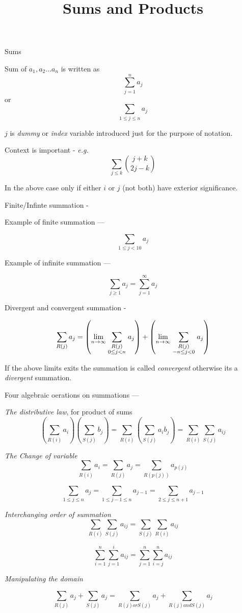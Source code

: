 \documentclass[12pt]{article}
\title{Sums and Products}
\begin{document}
\maketitle
  \begin{center}
    Sums
  \end{center}  
   Sum of $a_1,a_2 \ldots a_n$ is written as $$\sum_{j=1}^n {a_j} $$ or $$ \sum_{1 \le j \le n}a_j $$

   $j$ is {\sl dummy} or {\sl index} variable introduced just for the purpose of notation.

   Context is important - {\sl e.g.} $$ \sum _ {j \le k}{j+k \choose  2j -k}$$

   In the above case only if either $i$ or $j$ (not both) have exterior significance.

   Finite/Infinte summation -

   Example of finite summation ---

   $$ \sum_{1 \le j <10}{a_j} $$

   Example of infinite summation ---

   $$ \sum_{j \ge 1}{a_j} =  \sum_{j=1}^{\infty}{a_j} $$
   
   Divergent and convergent summation -

   $$  \sum_{R(j)}a_j = \left( \lim_{n\to\infty}\sum_{\scriptstyle R(j) \atop \scriptstyle 0  \le j < n} a_j \right) +
   \left( \lim_{n\to\infty}\sum_{\scriptstyle R(j) \atop  \scriptstyle -n \le j < 0}  a_j \right)  $$ 

   If the above limits exits the summation is called {\sl convergent} otherwise its a {\sl divergent} summation.

   Four algebraic oerations on summations ---

   \begin{enumerate}
     \begin{item}
       {\sl The distributive law}, for product of sums
       $$ \left(\sum_{R(i)}a_i\right) \left(\sum_{S(j)}b_j\right) = \sum_{R(i)}\left(\sum_{S(j)}a_ib_j\right) = \sum_{R(i)}\sum_{S(j)}a_{ij} $$
     \end{item}
     \begin{item}
       {\sl The Change of variable}
       $$\sum_{R(i)}a_i = \sum_{R(j)}a_j = \sum_{R(p(j))}a_{p(j)} $$

       $$\sum_{1 \le j \le n}a_j = \sum_{1 \le j-1 \le n }a_{j-1} = \sum_{2 \le j \le n+1}a_{j-1} $$
       
     \end{item}
     \begin{item}
       {\sl Interchanging order of summation}
       $$\sum_{R(i)}\sum_{S(j)} a_{ij} = \sum_{S(j)}\sum_{R(i)} a_{ij} $$

       $$\sum_{i=1}^n\sum_{j=1}^i a_{ij} = \sum_{j=1}^n\sum_{i=j}^n a_{ij} $$
     \end{item}
     \begin{item}
       {\sl Manipulating the domain}

       $$ \sum_{R(j)} a_j +  \sum_{S(j)} a_j  =  \sum_{R(j) or S(j)} a_j +  \sum_{R(j) and S(j)} a_j $$
     \end{item}
   \end{enumerate}
   
\end{document}
